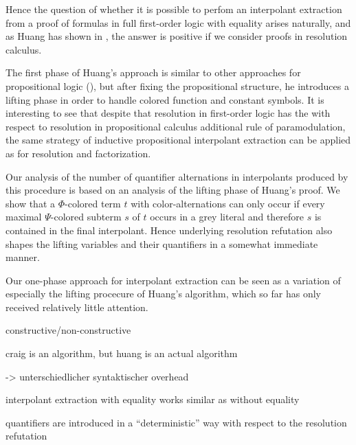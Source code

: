 Hence the question of whether it is possible to perfom an interpolant extraction from a proof of formulas in full first-order logic with equality arises naturally, and as Huang has shown in \cite{Huang95}, the answer is positive if we consider proofs in resolution calculus.

The first phase of Huang's approach is similar to other approaches for propositional logic (\cite{krajivcek1997interpolation,Pudlak97,McMillan03}),
but after fixing the propositional structure, he introduces a lifting phase in order to handle colored function and constant symbols.
It is interesting to see that despite that resolution in first-order logic has the with respect to resolution in propositional calculus additional rule of paramodulation, the same strategy of inductive propositional interpolant extraction can be applied as for resolution and factorization.

Our analysis of the number of quantifier alternations in interpolants produced by this procedure is based on an analysis of the lifting phase of Huang's proof.
We show that a $\Phi$-colored term $t$ with color-alternations can only occur if every maximal $\Psi$-colored subterm $s$ of $t$ occurs in a grey literal and therefore $s$ is contained in the final interpolant.
Hence underlying resolution refutation also shapes the lifting variables and their quantifiers in a somewhat immediate manner.

Our one-phase approach for interpolant extraction can be seen as a variation of especially the lifting procecure of Huang's algorithm, which so far has only received relatively little attention.











\clearpage

constructive/non-constructive

craig is an algorithm, but huang is an actual algorithm

-> unterschiedlicher syntaktischer overhead

interpolant extraction with equality works similar as without equality

quantifiers are introduced in a ``deterministic'' way with respect to the resolution refutation


